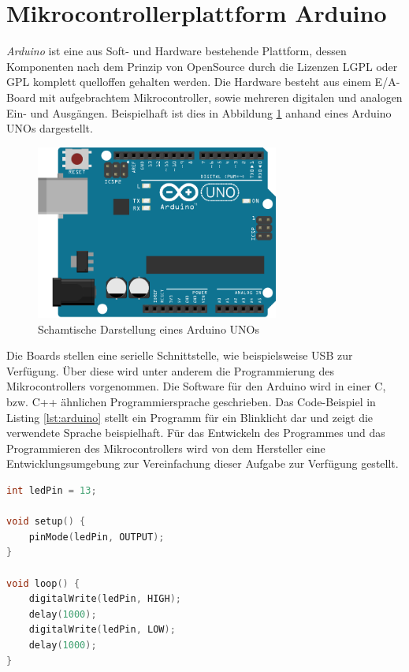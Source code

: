 \section{Mikrocontrollerplattform Arduino}
\textit{Arduino} ist eine aus Soft- und Hardware bestehende Plattform, dessen Komponenten nach dem Prinzip von OpenSource durch die Lizenzen \ac{LGPL} oder \ac{GPL} komplett quelloffen gehalten werden.
Die Hardware besteht aus einem E/A-Board mit aufgebrachtem Mikrocontroller, sowie mehreren digitalen und analogen Ein- und Ausgängen.
Beispielhaft ist dies in Abbildung \ref{fig:arduino_uno_schema} anhand eines Arduino UNOs dargestellt.
\begin{figure}[H]
	\centering
	\includegraphics[width=8cm]{images/chapter/02/arduino_uno.png}
	\caption{Schamtische Darstellung eines Arduino UNOs}
	\label{fig:arduino_uno_schema}
\end{figure}
Die Boards stellen eine serielle Schnittstelle, wie beispielsweise \ac{USB} zur Verfügung.
Über diese wird unter anderem die Programmierung des Mikrocontrollers vorgenommen.
Die Software für den Arduino wird in einer C, bzw. C++ ähnlichen Programmiersprache geschrieben.
Das Code-Beispiel in Listing \ref{lst:arduino} stellt ein Programm für ein Blinklicht dar und zeigt die verwendete Sprache beispielhaft.
Für das Entwickeln des Programmes und das Programmieren des Mikrocontrollers wird von dem Hersteller eine Entwicklungsumgebung zur Vereinfachung dieser Aufgabe zur Verfügung gestellt.

\begin{lstlisting}[language=C, label={lst:arduino}, caption=Beispiel-Code eines Blinklichtes für den Arduino]
int ledPin = 13;

void setup() {
    pinMode(ledPin, OUTPUT);
}

void loop() {
    digitalWrite(ledPin, HIGH);
    delay(1000);
    digitalWrite(ledPin, LOW);
    delay(1000);
}
\end{lstlisting}


